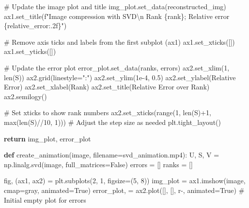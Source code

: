 \documentclass[
  russian,
  letterpaper,
  DIV=11,
  numbers=noendperiod]{scrartcl}
\newenvironment{Shaded}{\begin{snugshade}}{\end{snugshade}}
\newcommand{\BuiltInTok}[1]{\textcolor[rgb]{0.00,0.23,0.31}{#1}}
\newcommand{\CharTok}[1]{\textcolor[rgb]{0.13,0.47,0.30}{#1}}
\newcommand{\CommentTok}[1]{\textcolor[rgb]{0.37,0.37,0.37}{#1}}
\newcommand{\ControlFlowTok}[1]{\textcolor[rgb]{0.00,0.23,0.31}{\textbf{#1}}}
\newcommand{\DecValTok}[1]{\textcolor[rgb]{0.68,0.00,0.00}{#1}}
\newcommand{\FloatTok}[1]{\textcolor[rgb]{0.68,0.00,0.00}{#1}}
\newcommand{\KeywordTok}[1]{\textcolor[rgb]{0.00,0.23,0.31}{\textbf{#1}}}
\newcommand{\NormalTok}[1]{\textcolor[rgb]{0.00,0.23,0.31}{#1}}
\newcommand{\OperatorTok}[1]{\textcolor[rgb]{0.37,0.37,0.37}{#1}}
\newcommand{\SpecialCharTok}[1]{\textcolor[rgb]{0.37,0.37,0.37}{#1}}
\newcommand{\SpecialStringTok}[1]{\textcolor[rgb]{0.13,0.47,0.30}{#1}}
\newcommand{\StringTok}[1]{\textcolor[rgb]{0.13,0.47,0.30}{#1}}
\newcommand{\VariableTok}[1]{\textcolor[rgb]{0.07,0.07,0.07}{#1}}
\begin{document}
\begin{enumerate}
\begin{Shaded}
\begin{Highlighting}[]
    \CommentTok{\# Update the image plot and title}
\NormalTok{    img\_plot.set\_data(reconstructed\_img)}
\NormalTok{    ax1.set\_title(}\SpecialStringTok{f"Image compression with SVD}\CharTok{\textbackslash{}n}\SpecialStringTok{ Rank }\SpecialCharTok{\{}\NormalTok{rank}\SpecialCharTok{\}}\SpecialStringTok{; Relative error }\SpecialCharTok{\{}\NormalTok{relative\_error}\SpecialCharTok{:.2f\}}\SpecialStringTok{"}\NormalTok{)}

    \CommentTok{\# Remove axis ticks and labels from the first subplot (ax1)}
\NormalTok{    ax1.set\_xticks([])}
\NormalTok{    ax1.set\_yticks([])}

    \CommentTok{\# Update the error plot}
\NormalTok{    error\_plot.set\_data(ranks, errors)}
\NormalTok{    ax2.set\_xlim(}\DecValTok{1}\NormalTok{, }\BuiltInTok{len}\NormalTok{(S))}
\NormalTok{    ax2.grid(linestyle}\OperatorTok{=}\StringTok{":"}\NormalTok{)}
\NormalTok{    ax2.set\_ylim(}\FloatTok{1e{-}4}\NormalTok{, }\FloatTok{0.5}\NormalTok{)}
\NormalTok{    ax2.set\_ylabel(}\StringTok{\textquotesingle{}Relative Error\textquotesingle{}}\NormalTok{)}
\NormalTok{    ax2.set\_xlabel(}\StringTok{\textquotesingle{}Rank\textquotesingle{}}\NormalTok{)}
\NormalTok{    ax2.set\_title(}\StringTok{\textquotesingle{}Relative Error over Rank\textquotesingle{}}\NormalTok{)}
\NormalTok{    ax2.semilogy()}

    \CommentTok{\# Set xticks to show rank numbers}
\NormalTok{    ax2.set\_xticks(}\BuiltInTok{range}\NormalTok{(}\DecValTok{1}\NormalTok{, }\BuiltInTok{len}\NormalTok{(S)}\OperatorTok{+}\DecValTok{1}\NormalTok{, }\BuiltInTok{max}\NormalTok{(}\BuiltInTok{len}\NormalTok{(S)}\OperatorTok{//}\DecValTok{10}\NormalTok{, }\DecValTok{1}\NormalTok{)))  }\CommentTok{\# Adjust the step size as needed}
\NormalTok{    plt.tight\_layout()}

    \ControlFlowTok{return}\NormalTok{ img\_plot, error\_plot}


\KeywordTok{def}\NormalTok{ create\_animation(image, filename}\OperatorTok{=}\StringTok{\textquotesingle{}svd\_animation.mp4\textquotesingle{}}\NormalTok{):}
\NormalTok{    U, S, V }\OperatorTok{=}\NormalTok{ np.linalg.svd(image, full\_matrices}\OperatorTok{=}\VariableTok{False}\NormalTok{)}
\NormalTok{    errors }\OperatorTok{=}\NormalTok{ []}
\NormalTok{    ranks }\OperatorTok{=}\NormalTok{ []}

\NormalTok{    fig, (ax1, ax2) }\OperatorTok{=}\NormalTok{ plt.subplots(}\DecValTok{2}\NormalTok{, }\DecValTok{1}\NormalTok{, figsize}\OperatorTok{=}\NormalTok{(}\DecValTok{5}\NormalTok{, }\DecValTok{8}\NormalTok{))}
\NormalTok{    img\_plot }\OperatorTok{=}\NormalTok{ ax1.imshow(image, cmap}\OperatorTok{=}\StringTok{\textquotesingle{}gray\textquotesingle{}}\NormalTok{, animated}\OperatorTok{=}\VariableTok{True}\NormalTok{)}
\NormalTok{    error\_plot, }\OperatorTok{=}\NormalTok{ ax2.plot([], [], }\StringTok{\textquotesingle{}r{-}\textquotesingle{}}\NormalTok{, animated}\OperatorTok{=}\VariableTok{True}\NormalTok{)  }\CommentTok{\# Initial empty plot for errors}


\end{Highlighting}
\end{Shaded}
\end{enumerate}
\end{document}
